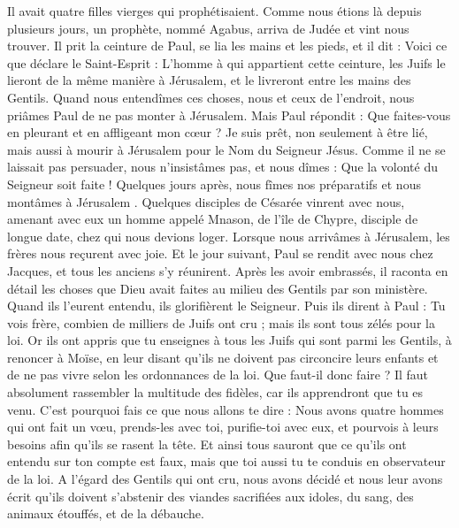 \begin{multicols}{2}
{{Il avait quatre filles vierges qui prophétisaient.
Comme nous étions là depuis plusieurs jours, un prophète, nommé Agabus, arriva de Judée
et vint nous trouver. Il prit la ceinture de Paul, se lia les mains et les pieds, et il dit : Voici ce que déclare le Saint-Esprit : L'homme à qui appartient cette ceinture, les Juifs le lieront de la même manière à Jérusalem, et le livreront entre les mains des Gentils.
Quand nous entendîmes ces choses, nous et ceux de l'endroit, nous priâmes Paul de ne pas monter à Jérusalem.
Mais Paul répondit : Que faites-vous en pleurant et en affligeant mon cœur ? Je suis prêt, non seulement à être lié, mais aussi à mourir à Jérusalem pour le Nom du Seigneur Jésus.
Comme il ne se laissait pas persuader, nous n'insistâmes pas, et nous dîmes : Que la volonté du Seigneur soit faite !
Quelques jours après, nous fîmes nos préparatifs et nous montâmes à Jérusalem .
Quelques disciples de Césarée vinrent avec nous, amenant avec eux un homme appelé Mnason, de l'île de Chypre, disciple de longue date, chez qui nous devions loger.
Lorsque nous arrivâmes à Jérusalem, les frères nous reçurent avec joie.
Et le jour suivant, Paul se rendit avec nous chez Jacques, et tous les anciens s'y réunirent.
Après les avoir embrassés, il raconta en détail les choses que Dieu avait faites au milieu des Gentils par son ministère.
Quand ils l'eurent entendu, ils glorifièrent le Seigneur. Puis ils dirent à Paul : Tu vois frère, combien de milliers de Juifs ont cru ; mais ils sont tous zélés pour la loi.
Or ils ont appris que tu enseignes à tous les Juifs qui sont parmi les Gentils, à renoncer à Moïse, en leur disant qu'ils ne doivent pas circoncire leurs enfants et de ne pas vivre selon les ordonnances de la loi.
Que faut-il donc faire ? Il faut absolument rassembler la multitude des fidèles, car ils apprendront que tu es venu.
C'est pourquoi fais ce que nous allons te dire : Nous avons quatre hommes qui ont fait un vœu,
prends-les avec toi, purifie-toi avec eux, et pourvois à leurs besoins afin qu'ils se rasent la tête. Et ainsi tous sauront que ce qu'ils ont entendu sur ton compte est faux, mais que toi aussi tu te conduis en observateur de la loi.
A l'égard des Gentils qui ont cru, nous avons décidé et nous leur avons écrit qu'ils doivent s'abstenir des viandes sacrifiées aux idoles, du sang, des animaux étouffés, et de la débauche.
}}
\end{multicols}
